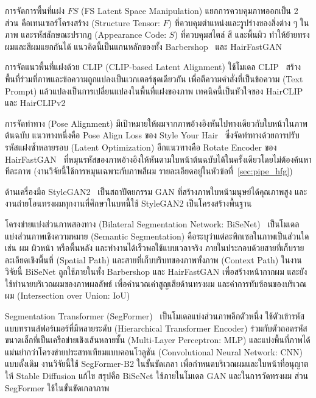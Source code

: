 การจัดการพื้นที่แฝง $FS$ (FS Latent Space Manipulation) แยกการควบคุมภาพออกเป็น 2 ส่วน
คือเทนเซอร์โครงสร้าง (Structure Tensor: $F$) ที่ควบคุมตำแหน่งและรูปร่างของสิ่งต่าง ๆ ในภาพ
และรหัสลักษณะปรากฏ (Appearance Code: $S$) ที่ควบคุมสไตล์ สี และพื้นผิว
ทำให้ย้ายทรงผมและสีผมแยกกันได้ แนวคิดนี้เป็นแกนหลักของทั้ง Barbershop~\cite{Zhu_2021}
และ HairFastGAN~\cite{nikolaev2024hairfastganrealisticrobusthair}

การจัดแนวพื้นที่แฝงด้วย CLIP (CLIP-based Latent Alignment)
ใช้โมเดล CLIP~\cite{radford2021learningtransferablevisualmodels} สร้างพื้นที่ร่วมที่ภาพและข้อความถูกแปลงเป็นเวกเตอร์ชุดเดียวกัน
เพื่อตีความคำสั่งที่เป็นข้อความ (Text Prompt) แล้วแปลงเป็นการเปลี่ยนแปลงในพื้นที่แฝงของภาพ
เทคนิคนี้เป็นหัวใจของ HairCLIP~\cite{wei2022hairclipdesignhairtext}
และ HairCLIPv2~\cite{wei2023hairclipv2unifyinghairediting}

การจัดท่าทาง (Pose Alignment) มีเป้าหมายให้ผมจากภาพอ้างอิงหันไปทางเดียวกับใบหน้าในภาพต้นฉบับ
แนวทางหนึ่งคือ Pose Align Loss ของ Style Your Hair~\cite{kim2022stylehairlatentoptimization}
ซึ่งจัดท่าทางด้วยการปรับรหัสแฝงซ้ำหลายรอบ (Latent Optimization)
อีกแนวทางคือ Rotate Encoder ของ HairFastGAN~\cite{nikolaev2024hairfastganrealisticrobusthair}
ที่หมุนรหัสของภาพอ้างอิงให้หันตามใบหน้าต้นฉบับได้ในครั้งเดียวโดยไม่ต้องค้นหาทีละภาพ
(งานวิจัยนี้ใช้การหมุนเฉพาะกับภาพสีผม รายละเอียดอยู่ในหัวข้อที่~\ref{sec:pipe_hfg})

ด้านเครื่องมือ StyleGAN2~\cite{karras2020analyzingimprovingimagequality} เป็นสถาปัตยกรรม GAN ที่สร้างภาพใบหน้ามนุษย์ได้คุณภาพสูง
และงานถ่ายโอนทรงผมทุกงานที่ศึกษาในบทนี้ใช้ StyleGAN2 เป็นโครงสร้างพื้นฐาน

โครงข่ายแบ่งส่วนภาพสองทาง (Bilateral Segmentation Network: BiSeNet)~\cite{yu2018bisenetbilateralsegmentationnetwork}
เป็นโมเดลแบ่งส่วนภาพเชิงความหมาย (Semantic Segmentation) คือระบุว่าแต่ละพิกเซลในภาพเป็นส่วนใด เช่น ผม ผิวหน้า หรือพื้นหลัง
และทำงานได้เร็วพอใช้แบบเวลาจริง ภายในประกอบด้วยสายที่เก็บรายละเอียดเชิงพื้นที่ (Spatial Path)
และสายที่เก็บบริบทของภาพทั้งภาพ (Context Path)
ในงานวิจัยนี้ BiSeNet ถูกใช้ภายในทั้ง Barbershop และ HairFastGAN เพื่อสร้างหน้ากากผม
และยังใช้ทำนายบริเวณผมของภาพผลลัพธ์ เพื่อคำนวณค่าสูญเสียด้านทรงผม
และค่าการทับซ้อนของบริเวณผม (Intersection over Union: IoU)

Segmentation Transformer (SegFormer)~\cite{xie2021segformersimpleefficientdesign} เป็นโมเดลแบ่งส่วนภาพอีกตัวหนึ่ง
ใช้ตัวเข้ารหัสแบบทรานส์ฟอร์เมอร์ที่มีหลายระดับ (Hierarchical Transformer Encoder)
ร่วมกับตัวถอดรหัสขนาดเล็กที่เป็นเครือข่ายเชิงเส้นหลายชั้น (Multi-Layer Perceptron: MLP)
และแบ่งพื้นที่ภาพได้แม่นยำกว่าโครงข่ายประสาทเทียมแบบคอนโวลูชัน (Convolutional Neural Network: CNN) แบบดั้งเดิม
งานวิจัยนี้ใช้ SegFormer-B2 ในขั้นขัดเกลา เพื่อกำหนดบริเวณผมและใบหน้าที่อนุญาตให้ Stable Diffusion แก้ไข
สรุปคือ BiSeNet ใช้ภายในโมเดล GAN และในการวัดทรงผม ส่วน SegFormer ใช้ในขั้นขัดเกลาภาพ

